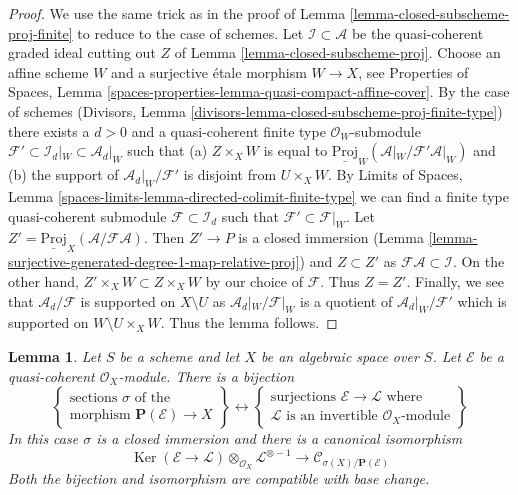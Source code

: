 \documentclass{stacks-project}
\theoremstyle{plain}
\newtheorem{lemma}[subsection]{Lemma}
\theoremstyle{definition}
\theoremstyle{remark}
\numberwithin{equation}{subsection}
\def\Ker{\mathop{\mathrm{Ker}}}
\begin{document}
\begin{proof}
We use the same trick as in the proof of
Lemma \ref{lemma-closed-subscheme-proj-finite}
to reduce to the case of schemes.
Let $\mathcal{I} \subset \mathcal{A}$ be the quasi-coherent graded
ideal cutting out $Z$ of Lemma \ref{lemma-closed-subscheme-proj}.
Choose an affine scheme $W$ and a surjective \'etale morphism
$W \to X$, see Properties of Spaces, Lemma
\ref{spaces-properties-lemma-quasi-compact-affine-cover}.
By the case of schemes
(Divisors, Lemma \ref{divisors-lemma-closed-subscheme-proj-finite-type})
there exists a $d > 0$ and a quasi-coherent finite type
$\mathcal{O}_W$-submodule
$\mathcal{F}' \subset \mathcal{I}_d|_W \subset \mathcal{A}_d|_W$
such that (a) $Z \times_X W$ is equal to
$\underline{\text{Proj}}_W(\mathcal{A}|_W/\mathcal{F}'\mathcal{A}|_W)$
and (b) the support of $\mathcal{A}_d|_W/\mathcal{F}'$ is disjoint from
$U \times_X W$. By Limits of Spaces, Lemma
\ref{spaces-limits-lemma-directed-colimit-finite-type}
we can find a finite type quasi-coherent submodule
$\mathcal{F} \subset \mathcal{I}_d$ such that
$\mathcal{F}' \subset \mathcal{F}|_W$. Let
$Z' = \underline{\text{Proj}}_X(\mathcal{A}/\mathcal{F}\mathcal{A})$.
Then $Z' \to P$ is a closed immersion
(Lemma \ref{lemma-surjective-generated-degree-1-map-relative-proj})
and $Z \subset Z'$ as $\mathcal{F}\mathcal{A} \subset \mathcal{I}$.
On the other hand, $Z' \times_X W \subset Z \times_X W$ by our
choice of $\mathcal{F}$. Thus $Z = Z'$.
Finally, we see that $\mathcal{A}_d/\mathcal{F}$ is supported on
$X \setminus U$ as $\mathcal{A}_d|_W/\mathcal{F}|_W$ is a quotient
of $\mathcal{A}_d|_W/\mathcal{F}'$ which is supported on
$W \setminus U \times_X W$. Thus the lemma follows.
\end{proof}

\begin{lemma}
\label{lemma-conormal-sheaf-section-projective-bundle}
Let $S$ be a scheme and let $X$ be an algebraic space over $S$.
Let $\mathcal{E}$ be a quasi-coherent $\mathcal{O}_X$-module.
There is a bijection
$$
\left\{
\begin{matrix}
\text{sections }\sigma\text{ of the } \\
\text{morphism } \mathbf{P}(\mathcal{E}) \to X
\end{matrix}
\right\}
\leftrightarrow
\left\{
\begin{matrix}
\text{surjections }\mathcal{E} \to \mathcal{L}\text{ where} \\
\mathcal{L}\text{ is an invertible }\mathcal{O}_X\text{-module}
\end{matrix}
\right\}
$$
In this case $\sigma$ is a closed immersion and there is a canonical
isomorphism
$$
\Ker(\mathcal{E} \to \mathcal{L})
\otimes_{\mathcal{O}_X} \mathcal{L}^{\otimes -1}
\longrightarrow
\mathcal{C}_{\sigma(X)/\mathbf{P}(\mathcal{E})}
$$
Both the bijection and isomorphism are compatible with base change.
\end{lemma}
\end{document}
